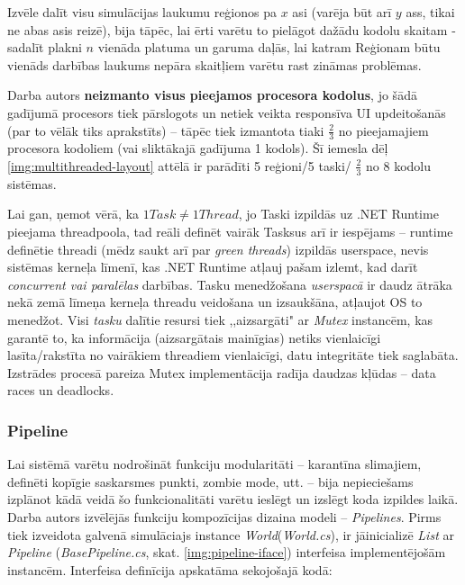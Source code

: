 Izvēle dalīt visu simulācijas laukumu reģionos pa \(x\) asi (varēja būt arī \(y\)
ass, tikai ne abas asis reizē), bija tāpēc, lai ērti varētu to pielāgot dažādu
kodolu skaitam -  sadalīt plakni \(n\) vienāda platuma un garuma daļās, lai
katram Reģionam būtu vienāds darbības laukums nepāra skaitļiem varētu rast zināmas problēmas.

Darba autors \textbf{neizmanto visus pieejamos procesora kodolus}, jo šādā gadījumā
procesors tiek pārslogots un netiek veikta responsīva UI updeitošanās (par to
vēlāk tiks aprakstīts) -- tāpēc tiek izmantota tiaki \(\frac{2}{3}\) no
pieejamajiem procesora kodoliem (vai sliktākajā gadījuma 1 kodols). Šī iemesla dēļ
\ref{img:multithreaded-layout} attēlā ir parādīti 5 reģioni/5 taski/ \(\frac{2}{3}\) no 8 kodolu sistēmas.

Lai gan, ņemot vērā, ka \(1 Task\neq 1 Thread\), jo Taski izpildās uz .NET Runtime
pieejama threadpoola\cite{csharp:tasks-not-threads}, tad reāli definēt vairāk
Tasksus arī ir iespējams -- runtime definētie threadi (mēdz saukt arī par
\emph{green threads}\cite{progr:green-threads}) izpildās
userspace\cite{sys:userspace}, nevis sistēmas kerneļa līmenī, kas .NET Runtime
atļauj pašam izlemt, kad darīt \emph{concurrent vai paralēlas}\cite{csharp:concurrent-parallel} darbības.
Tasku menedžošana
\emph{userspacā} ir daudz ātrāka nekā zemā līmeņa kerneļa threadu veidošana un izsaukšāna, atļaujot OS to menedžot.
Visi \emph{tasku} dalītie resursi tiek ,,aizsargāti" ar \emph{Mutex}\cite{csharp:mutex}
instancēm, kas garantē to, ka informācija (aizsargātais mainīgias) netiks vienlaicīgi lasīta/rakstīta no
vairākiem threadiem vienlaicīgi, datu integritāte tiek saglabāta. Izstrādes procesā
pareiza Mutex implementācija radīja daudzas kļūdas -- data races un deadlocks.

\subsubsection*{Pipeline}

Lai sistēmā varētu nodrošināt funkciju modularitāti -- karantīna slimajiem,
definēti kopīgie saskarsmes punkti, zombie mode, utt. -- bija nepieciešams
izplānot kādā veidā šo funkcionalitāti varētu ieslēgt un izslēgt koda izpildes
laikā. Darba autors izvēlējās funkciju kompozīcijas dizaina modeli --
\emph{Pipelines}\cite{progr:pipelines}. Pirms tiek izveidota galvenā simulāciajs
instance \emph{World}(\emph{World.cs}), ir jāinicializē \emph{List} ar
\emph{Pipeline} (\emph{BasePipeline.cs}, skat. \ref{img:pipeline-iface})
interfeisa implementējošām instancēm. Interfeisa definīcija apskatāma sekojošajā kodā:


